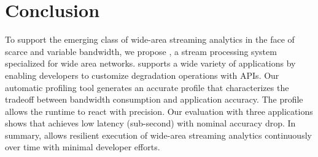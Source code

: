 \section{Conclusion}
\label{sec:conclusion}

To support the emerging class of wide-area streaming analytics in the face of
scarce and variable bandwidth, we propose \sysname{}, a stream
processing system specialized for wide area networks. \sysname{} supports a wide
variety of applications by enabling developers to customize degradation
operations with \maybe{} APIs. Our automatic profiling tool generates an
accurate profile that characterizes the tradeoff between bandwidth consumption and application
accuracy. The profile allows the runtime to react with precision. Our evaluation
with three applications shows that \sysname{} achieves low latency (sub-second)
with nominal accuracy drop. In summary, \sysname{} allows resilient execution of
wide-area streaming analytics continuously over time with minimal developer
efforts.


